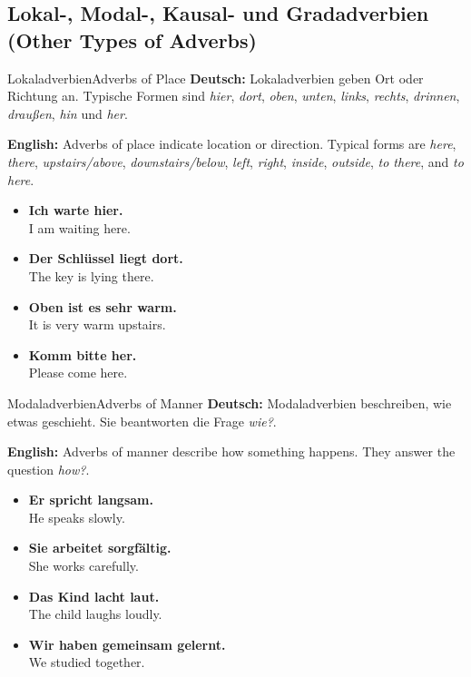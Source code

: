 \documentclass[a4paper,11pt]{article}
\newcommand{\GermanText}[1]{\textbf{Deutsch: }#1\par}
\newcommand{\EnglishText}[1]{{\color{SoftGray}\textbf{English: }#1\par}}
\newcommand{\ExampleItem}[2]{\item \textbf{#1}\\{\color{SoftGray}#2}}
\begin{document}
\subsection{Lokal-, Modal-, Kausal- und Gradadverbien {\small (Other Types of Adverbs)}}

\begin{grammarentry}{Lokaladverbien}{Adverbs of Place}
    \GermanText{Lokaladverbien geben Ort oder Richtung an. Typische Formen sind \textit{hier}, \textit{dort}, \textit{oben}, \textit{unten}, \textit{links}, \textit{rechts}, \textit{drinnen}, \textit{draußen}, \textit{hin} und \textit{her}.}
    \EnglishText{Adverbs of place indicate location or direction. Typical forms are \textit{here}, \textit{there}, \textit{upstairs/above}, \textit{downstairs/below}, \textit{left}, \textit{right}, \textit{inside}, \textit{outside}, \textit{to there}, and \textit{to here}.}
    \begin{exbox}
        \begin{itemize}
            \ExampleItem{Ich warte hier.}{I am waiting here.}
            \ExampleItem{Der Schlüssel liegt dort.}{The key is lying there.}
            \ExampleItem{Oben ist es sehr warm.}{It is very warm upstairs.}
            \ExampleItem{Komm bitte her.}{Please come here.}
        \end{itemize}
    \end{exbox}
\end{grammarentry}

\begin{grammarentry}{Modaladverbien}{Adverbs of Manner}
    \GermanText{Modaladverbien beschreiben, wie etwas geschieht. Sie beantworten die Frage \textit{wie?}.}
    \EnglishText{Adverbs of manner describe how something happens. They answer the question \textit{how?}.}
    \begin{exbox}
        \begin{itemize}
            \ExampleItem{Er spricht langsam.}{He speaks slowly.}
            \ExampleItem{Sie arbeitet sorgfältig.}{She works carefully.}
            \ExampleItem{Das Kind lacht laut.}{The child laughs loudly.}
            \ExampleItem{Wir haben gemeinsam gelernt.}{We studied together.}
        \end{itemize}
    \end{exbox}
\end{grammarentry}
\end{document}
